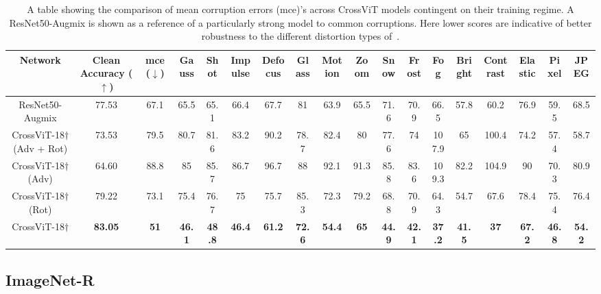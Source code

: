 \documentclass{article} %
\newcommand{\BlueM}{\textcolor{BlueModel}}
\newcommand{\GreenM}{\textcolor{GreenModel}}
\newcommand{\PinkM}{\textcolor{PinkModel}}
\newcommand{\OrangeM}{\textcolor{OrangeModel}}
\begin{document}
\begin{table}[h!]
  \centering
  \begin{adjustbox}{width=\textwidth}
    \begin{tabular}{c|cc|ccccccccccccccc}
    Network & Clean Accuracy ($\uparrow$) & mce ($\downarrow$) & Gauss & Shot & Impulse & Defocus & Glass & Motion & Zoom & Snow & Frost & Fog & Bright & Contrast & Elastic & Pixel & JPEG \\\midrule  
    ResNet50-Augmix & 77.53 & 67.1 & 65.5 & 65.1 & 66.4 & 67.7 & 81 & 63.9 & 65.5 & 71.6 & 70.9 & 66.5 & 57.8 & 60.2 & 76.9 & 59.5 & 68.5\\\midrule 
    \BlueM{CrossViT-18$\dagger$ (Adv + Rot)} & 73.53 & 79.5 & 80.7 & 81.6 & 83.2 & 90.2 & 78.7 & 82.4 & 80 & 77.6 & 74 & 107.9 & 65 & 100.4 & 74.2 & 57.4 & 58.7 \\\midrule    
    \GreenM{CrossViT-18$\dagger$ (Adv)} & 64.60 & 88.8 & 85 & 85.7 & 86.7 & 96.7 & 88 & 92.1 & 91.3 & 85.8 & 83.6 & 109.3 & 82.2 & 104.9 & 90 & 70.3 & 80.9 \\\midrule
    \PinkM{CrossViT-18$\dagger$ (Rot)}& 79.22 &  73.1 & 75.4 & 76.7 & 75 & 75.7 & 85.3 & 72.3 & 79.2 & 68.8 & 70.9 & 64.3 & 54.7 & 67.6 & 78.4 & 75.4 & 76.4 \\\midrule
    \OrangeM{CrossViT-18$\dagger$} & \textbf{83.05} & \textbf{51} & \textbf{46.1} & \textbf{48.8} & \textbf{46.4} & \textbf{61.2} & \textbf{72.6} & \textbf{54.4} & \textbf{65} & \textbf{44.9} & \textbf{42.1} & \textbf{37.2} & \textbf{41.5} & \textbf{37} & \textbf{67.2} & \textbf{46.8} & \textbf{54.2} \\\midrule 
    \end{tabular}
  \end{adjustbox}
  \vspace{4pt}
  \caption{A table showing the comparison of mean corruption errors (mce)'s across CrossViT models contingent on their training regime. A ResNet50-Augmix is shown as a reference of a particularly strong model to common corruptions. Here lower scores are indicative of better robustness to the different distortion types of~\cite{hendrycks2018benchmarking}.}
  \label{table:Corruptions}
\end{table}


\subsection{ImageNet-R}
\end{document}
